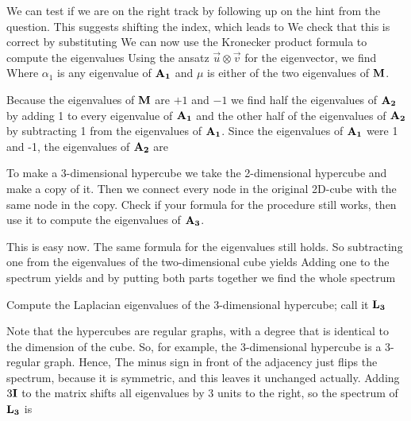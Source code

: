 We can test if we are on the right track by following up on the hint from the question. This suggests shifting the index, which leads to 
We check that this is correct by substituting
We can now use the Kronecker product formula to compute the eigenvalues Using the ansatz $\vec{u}\otimes\vec{v}$ for the eigenvector, we find
Where $\alpha_1$ is any eigenvalue of $\bf A_1$ and $\mu$ is either of the two eigenvalues of $\bf M$.

Because the eigenvalues of $\bf M$ are $+1$ and $-1$ we find half the eigenvalues of $\bf A_2$ by adding 1 to every eigenvalue of $\bf A_1$ and the other half of the eigenvalues of $\bf A_2$ by subtracting 1 from the eigenvalues of $\bf A_1$. Since the eigenvalues of $\bf A_1$ were 1 and -1, the eigenvalues of $\bf A_2$ are

\subquestion
To make a 3-dimensional hypercube we take the 2-dimensional hypercube and make a copy of it. Then we connect every node in the original 2D-cube with the same node in the copy. Check if your formula for the procedure still works, then use it to compute the eigenvalues of $\bf A_3$. 

\solution 
This is easy now. The same formula for the eigenvalues still holds. So subtracting one from the eigenvalues of the two-dimensional cube yields
Adding one to the spectrum yields
and by putting both parts together we find the whole spectrum

\subquestion
Compute the Laplacian eigenvalues of the 3-dimensional hypercube; call it $\bf L_3$ 

\solution
Note that the hypercubes are regular graphs, with a degree that is identical to the dimension of the cube. So, for example, the 3-dimensional hypercube is a 3-regular graph. Hence, 
The minus sign in front of the adjacency just flips the spectrum, because it is symmetric, and this leaves it unchanged actually. Adding $3{\bf I}$ to the matrix shifts all eigenvalues by 3 units to the right, so the spectrum of ${\bf L_3}$ is

